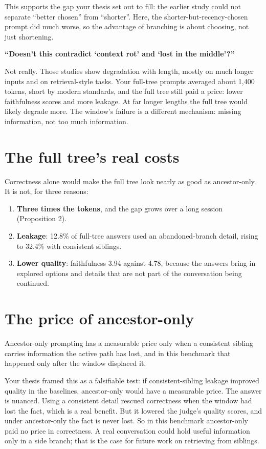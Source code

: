 This supports the gap your thesis set out to fill: the earlier study could not separate ``better chosen'' from ``shorter''. Here, the shorter-but-recency-chosen prompt did much worse, so the advantage of branching is about choosing, not just shortening.

\begin{ask}
\textbf{``Doesn't this contradict `context rot' and `lost in the middle'?''}\par
Not really. Those studies show degradation with length, mostly on much longer inputs and on retrieval-style tasks. Your full-tree prompts averaged about 1,400 tokens, short by modern standards, and the full tree still paid a price: lower faithfulness scores and more leakage. At far longer lengths the full tree would likely degrade more. The window's failure is a different mechanism: missing information, not too much information.
\end{ask}

\section{The full tree's real costs}

Correctness alone would make the full tree look nearly as good as ancestor-only. It is not, for three reasons:
\begin{enumerate}
\item \textbf{Three times the tokens}, and the gap grows over a long session (Proposition 2).
\item \textbf{Leakage}: 12.8\% of full-tree answers used an abandoned-branch detail, rising to 32.4\% with consistent siblings.
\item \textbf{Lower quality}: faithfulness 3.94 against 4.78, because the answers bring in explored options and details that are not part of the conversation being continued.
\end{enumerate}

\section{The price of ancestor-only}

\begin{paper}
Ancestor-only prompting has a measurable price only when a consistent sibling carries information the active path has lost, and in this benchmark that happened only after the window displaced it.
\end{paper}

Your thesis framed this as a falsifiable test: if consistent-sibling leakage improved quality in the baselines, ancestor-only would have a measurable price. The answer is nuanced. Using a consistent detail rescued correctness when the window had lost the fact, which is a real benefit. But it lowered the judge's quality scores, and under ancestor-only the fact is never lost. So in this benchmark ancestor-only paid no price in correctness. A real conversation could hold useful information only in a side branch; that is the case for future work on retrieving from siblings.

